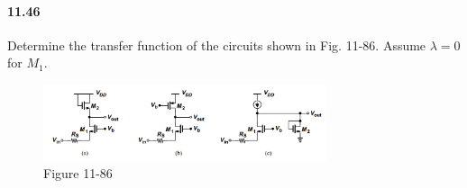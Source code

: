 \documentclass[hyperref, UTF8]{ctexart}
\begin{document}
\paragraph{11.46} \label{11.46}
    Determine the transfer function of the circuits shown in Fig. 11-86. Assume $\lambda = 0$ for $M_1$.

    \begin{figure}[!htb]
        \centering
        \includegraphics[width=0.740\textwidth]{p11-86.png}
        \caption*{Figure 11-86}
    \end{figure}
\end{document}
